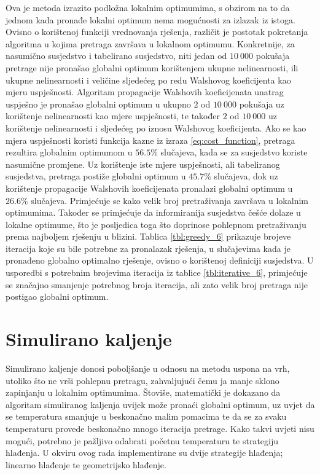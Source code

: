 Ova je metoda izrazito podložna lokalnim optimumima, s obzirom na to da jednom kada pronađe lokalni optimum nema mogućnosti za izlazak iz istoga.
Ovisno o korištenoj funkciji vrednovanja rješenja, različit je postotak pokretanja algoritma u kojima pretraga završava u lokalnom optimumu.
Konkretnije, za nasumično susjedstvo i tabelirano susjedstvo, niti jedan od $10\:000$ pokušaja pretrage nije pronašao globalni optimum korištenjem ukupne nelinearnosti, ili ukupne nelinearnosti i veličine sljedećeg po redu Walshovog koeficijenta kao mjeru uspješnosti.
Algoritam propagacije Walshovih koeficijenata unatrag uspješno je pronašao globalni optimum u ukupno $2$ od $10\:000$ pokušaja uz korištenje nelinearnosti kao mjere uspješnosti, te također $2$ od $10\:000$ uz korištenje nelinearnosti i sljedećeg po iznosu Walshovog koeficijenta.
Ako se kao mjera uspješnosti koristi funkcija kazne iz izraza \eqref{eq:cost_function}, pretraga rezultira globalnim optimumom u $56.5\%$ slučajeva, kada se za susjedstvo koriste nasumične promjene.
Uz korištenje iste mjere uspješnosti, ali tabeliranog susjedstva, pretraga postiže globalni optimum u $45.7\%$ slučajeva, dok uz korištenje propagacije Walshovih koeficijenata pronalazi globalni optimum u $26.6\%$ slučajeva.
Primjećuje se kako velik broj pretraživanja završava u lokalnim optimumima.
Također se primjećuje da informiranija susjedstva češće dolaze u lokalne optimume, što je posljedica toga što doprinose pohlepnom pretraživanju prema najboljem rješenju u blizini.
Tablica \ref{tbl:greedy_6} prikazuje brojeve iteracija koje su bile potrebne za pronalazak rješenja, u slučajevima kada je pronađeno globalno optimalno rješenje, ovisno o korištenoj definiciji susjedstva.
U usporedbi s potrebnim brojevima iteracija iz tablice \ref{tbl:iterative_6}, primjećuje se značajno smanjenje potrebnog broja iteracija, ali zato velik broj pretraga nije postigao globalni optimum.

\section{Simulirano kaljenje}
Simulirano kaljenje donosi poboljšanje u odnosu na metodu uspona na vrh, utoliko što ne vrši pohlepnu pretragu, zahvaljujući čemu ja manje sklono zapinjanju u lokalnim optimumima.
Štoviše, matematički je dokazano da algoritam simuliranog kaljenja uvijek može pronaći globalni optimum, uz uvjet da se temperatura smanjuje u beskonačno malim pomacima te da se za svaku temperaturu provede beskonačno mnogo iteracija pretrage.
Kako takvi uvjeti nisu mogući, potrebno je pažljivo odabrati početnu temperaturu te strategiju hlađenja.
U okviru ovog rada implementirane su dvije strategije hlađenja; linearno hlađenje te geometrijsko hlađenje.

